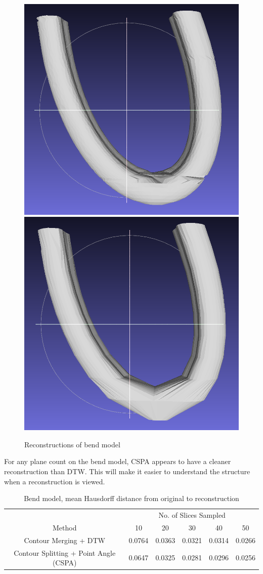 \documentclass[11p, titlepage]{article}
\newcommand{\reconstructionright}{0.67}
\begin{document}
\begin{figure}[h!]
\begin{minipage}[b]{\reconstructionright\linewidth}
       \hfill
       {\includegraphics[width=.48\linewidth]{reconstructions/cspa50-bend-50}}%
       \hfill
       {\includegraphics[width=.48\linewidth]{reconstructions/cspa50-bend-10}}
     \end{minipage}%
        \caption{Reconstructions of bend model}
        \label{fig:bend_reconstructions}
\end{figure}

For any plane count on the bend model, CSPA appears to have a cleaner reconstruction than DTW. This will make it easier to understand the structure when a reconstruction is viewed.

\begin{table}[h!]
\begin{tabular}{ | c | c | c | c | c | c | }
\hline
& \multicolumn{5}{c|}{No. of Slices Sampled} \\
\cline{2-6}
Method & 10 & 20 & 30 & 40 & 50 \\
\hline
Contour Merging + DTW & 0.0764 & 0.0363 & 0.0321 & 0.0314 & 0.0266 \\
Contour Splitting + Point Angle (CSPA) & 0.0647 & 0.0325 & 0.0281 & 0.0296 & 0.0256 \\
\hline
\end{tabular}
\caption{Bend model, mean Hausdorff distance from original to reconstruction}
\label{table:bend_forward}
\end{table}
\end{document}
